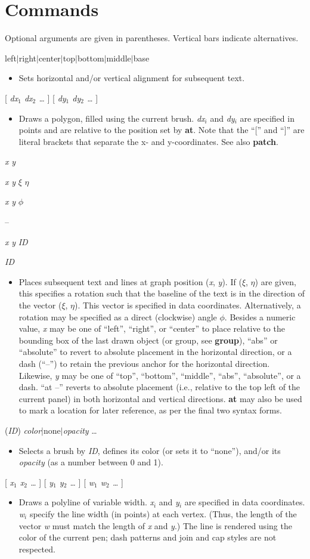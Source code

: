 \documentclass[11pt]{article}
\def\cmd#1#2{\noindent {\bf #1} #2\par}
\def\expl#1{\kern-8pt\begin{itemize}\item[]#1\end{itemize}}
\def\cref#1{{\bf #1}}
\def\bar{{$|$}}
\begin{document}
\section{Commands}
Optional arguments are given in parentheses. Vertical bars indicate
alternatives.\bigskip

\cmd{align}{left\bar{}right\bar{}center\bar{}top\bar{}bottom\bar{}middle\bar{}base}
\expl{Sets horizontal and/or vertical alignment for subsequent text.}

\cmd{area}{[ \emph{dx$_1$ dx$_2$ \ldots} ] [ \emph{dy$_1$ dy$_2$ \ldots}
]}
\expl{Draws a polygon, filled using the current brush. 
  \emph{dx$_i$} and \emph{dy$_i$} are specified in
  points and are relative to the position set by \cref{at}. Note that
  the ``['' and ``]'' are literal brackets that separate the x- and 
  y-coordinates. See also \cref{patch}.}

\cmd{at}{\emph{x} \emph{y}}
\cmd{at}{\emph{x} \emph{y} \emph{$\xi$} \emph{$\eta$}}
\cmd{at}{\emph{x} \emph{y} \emph{$\phi$}}
\cmd{at}{--}
\cmd{at}{\emph{x} \emph{y} \emph{ID}}
\cmd{at}{\emph{ID}}
\expl{Places subsequent text and lines at graph
    position (\emph{x}, \emph{y}). If (\emph{$\xi$}, \emph{$\eta$})
    are given, this specifies a rotation such that the baseline of the
    text is in the direction of the vector (\emph{$\xi$},
    \emph{$\eta$}). This vector is specified in data
    coordinates. Alternatively, a rotation may be specified as a
    direct (clockwise) angle $\phi$. Besides a numeric value, \emph{x}
    may be one of {``left''}, {``right''}, or {``center''} to place 
    relative to the
    bounding box of the last drawn object (or group, see
    \cref{group}), ``abs'' or ``absolute'' to revert to absolute
    placement in the horizontal direction, or a dash (``--'') to
    retain the previous anchor for
    the horizontal direction.  
    Likewise, \emph{y} may be one of {``top''}, {``bottom''},
    {``middle''}, ``abs'', ``absolute'', or a dash. ``at --''
    reverts to absolute placement (i.e., relative to the top left of the
    current panel)
    in both horizontal and vertical directions. \cref{at} may also be
    used to mark a location for later reference, as per the final two
    syntax forms.}

\cmd{brush}{(\emph{ID}) \emph{color}\bar{}none\bar{}\emph{opacity} \ldots}
\expl{Selects a brush by \emph{ID}, defines its color (or sets it to
  ``none''), and/or its \emph{opacity} (as a number between 0 and 1).}

\cmd{caligraph}{[ \emph{x$_1$ x$_2$ \ldots} ] 
                [ \emph{y$_1$ y$_2$ \ldots} ]
                [ \emph{w$_1$ w$_2$ \ldots} ]}
\expl{Draws a polyline of variable width.  \emph{x$_i$}
  and \emph{y$_i$} are specified in data coordinates. \emph{w$_i$}
  specify the line width (in points) at each vertex. (Thus, the length
  of the vector \emph{w} must match the length of \emph{x} and
  \emph{y}.) The line is rendered using the color of the current pen;
  dash patterns and join and cap styles are not respected.}
\end{document}

